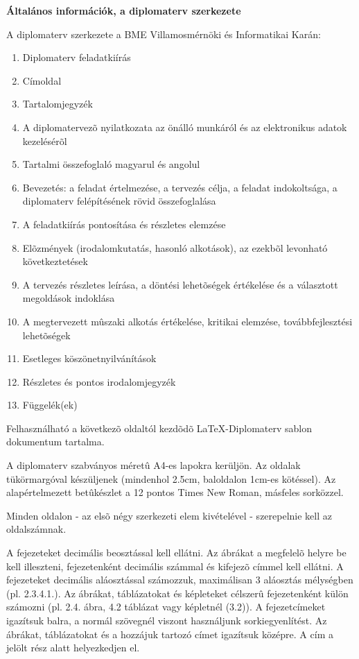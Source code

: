 
\footnotesize
\begin{center}
\large
\textbf{\Large Általános információk, a diplomaterv szerkezete}\\
\end{center}

A diplomaterv szerkezete a BME Villamosmérnöki és Informatikai Karán:
\begin{enumerate}
\item	Diplomaterv feladatkiírás
\item	Címoldal
\item	Tartalomjegyzék
\item	A diplomatervezõ nyilatkozata az önálló munkáról és az elektronikus adatok kezelésérõl
\item	Tartalmi összefoglaló magyarul és angolul
\item	Bevezetés: a feladat értelmezése, a tervezés célja, a feladat indokoltsága, a diplomaterv felépítésének rövid összefoglalása
\item	A feladatkiírás pontosítása és részletes elemzése
\item	Elõzmények (irodalomkutatás, hasonló alkotások), az ezekbõl levonható következtetések
\item	A tervezés részletes leírása, a döntési lehetõségek értékelése és a választott megoldások indoklása
\item	A megtervezett mûszaki alkotás értékelése, kritikai elemzése, továbbfejlesztési lehetõségek
\item	Esetleges köszönetnyilvánítások
\item	Részletes és pontos irodalomjegyzék
\item	Függelék(ek)
\end{enumerate}

Felhasználható a következõ oldaltól kezdõdõ \LaTeX-Diplomaterv sablon dokumentum tartalma. 

A diplomaterv szabványos méretû A4-es lapokra kerüljön. Az oldalak tükörmargóval készüljenek (mindenhol 2.5cm, baloldalon 1cm-es kötéssel). Az alapértelmezett betûkészlet a 12 pontos Times New Roman, másfeles sorközzel.

Minden oldalon - az elsõ négy szerkezeti elem kivételével - szerepelnie kell az oldalszámnak.

A fejezeteket decimális beosztással kell ellátni. Az ábrákat a megfelelõ helyre be kell illeszteni, fejezetenként decimális számmal és kifejezõ címmel kell ellátni. A fejezeteket decimális aláosztással számozzuk, maximálisan 3 aláosztás mélységben (pl. 2.3.4.1.). Az ábrákat, táblázatokat és képleteket célszerû fejezetenként külön számozni (pl. 2.4. ábra, 4.2 táblázat vagy képletnél (3.2)). A fejezetcímeket igazítsuk balra, a normál szövegnél viszont használjunk sorkiegyenlítést. Az ábrákat, táblázatokat és a hozzájuk tartozó címet igazítsuk középre. A cím a jelölt rész alatt helyezkedjen el.

